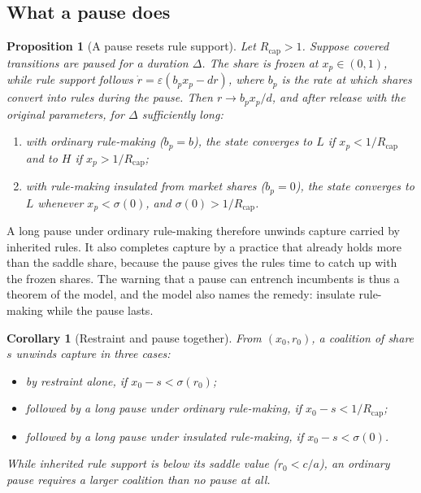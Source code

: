 \documentclass[11pt]{article}
\theoremstyle{plain}
\newtheorem{proposition}{Proposition}
\newtheorem{corollary}{Corollary}
\theoremstyle{definition}
\newcommand{\Rcap}{R_{\mathrm{cap}}}
\begin{document}
\subsection{What a pause does}

\begin{proposition}[A pause resets rule support]\label{prop:pause}
Let $\Rcap>1$. Suppose covered transitions are paused for a duration $\Delta$. The share is frozen at $x_p\in(0,1)$, while rule support follows $\dot r=\varepsilon(b_px_p-dr)$, where $b_p$ is the rate at which shares convert into rules during the pause. Then $r\to b_px_p/d$, and after release with the original parameters, for $\Delta$ sufficiently long:
\begin{enumerate}[label=(\roman*),leftmargin=*]
\item with ordinary rule-making ($b_p=b$), the state converges to $L$ if $x_p<1/\Rcap$ and to $H$ if $x_p>1/\Rcap$;
\item with rule-making insulated from market shares ($b_p=0$), the state converges to $L$ whenever $x_p<\sigma(0)$, and $\sigma(0)>1/\Rcap$.
\end{enumerate}
\end{proposition}

A long pause under ordinary rule-making therefore unwinds capture carried by inherited rules. It also completes capture by a practice that already holds more than the saddle share, because the pause gives the rules time to catch up with the frozen shares. The warning that a pause can entrench incumbents is thus a theorem of the model, and the model also names the remedy: insulate rule-making while the pause lasts.

\begin{corollary}[Restraint and pause together]\label{cor:together}
From $(x_0,r_0)$, a coalition of share $s$ unwinds capture in three cases:
\begin{itemize}[leftmargin=*]
\item by restraint alone, if $x_0-s<\sigma(r_0)$;
\item followed by a long pause under ordinary rule-making, if $x_0-s<1/\Rcap$;
\item followed by a long pause under insulated rule-making, if $x_0-s<\sigma(0)$.
\end{itemize}
While inherited rule support is below its saddle value ($r_0<c/a$), an ordinary pause requires a larger coalition than no pause at all.
\end{corollary}
\end{document}

